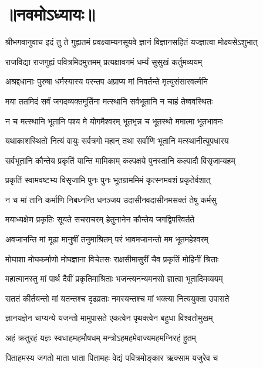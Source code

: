 \section{॥नवमोऽध्यायः॥}
{श्रीभगवानुवाच}
\twolineshloka
{इदं तु ते गुह्यतमं प्रवक्ष्याम्यनसूयवे}
{ज्ञानं विज्ञानसहितं यज्ज्ञात्वा मोक्ष्यसेऽशुभात्}%

\twolineshloka
{राजविद्या राजगुह्यं पवित्रमिदमुत्तमम्}
{प्रत्यक्षावगमं धर्म्यं सुसुखं कर्तुमव्ययम्}%

\twolineshloka
{अश्रद्दधानाः पुरुषा धर्मस्यास्य परन्तप}
{अप्राप्य मां निवर्तन्ते मृत्युसंसारवर्त्मनि}%

\twolineshloka
{मया ततमिदं सर्वं जगदव्यक्तमूर्तिना}
{मत्स्थानि सर्वभूतानि न चाहं तेष्ववस्थितः}%

\twolineshloka
{न च मत्स्थानि भूतानि पश्य मे योगमैश्वरम्}
{भूतभृन्न च भूतस्थो ममात्मा भूतभावनः}%

\twolineshloka
{यथाकाशस्थितो नित्यं वायुः सर्वत्रगो महान्}
{तथा सर्वाणि भूतानि मत्स्थानीत्युपधारय}%

\twolineshloka
{सर्वभूतानि कौन्तेय प्रकृतिं यान्ति मामिकाम्}
{कल्पक्षये पुनस्तानि कल्पादौ विसृजाम्यहम्}%

\twolineshloka
{प्रकृतिं स्वामवष्टभ्य विसृजामि पुनः पुनः}
{भूतग्राममिमं कृत्स्नमवशं प्रकृतेर्वशात्}%

\twolineshloka
{न च मां तानि कर्माणि निबध्नन्ति धनञ्जय}
{उदासीनवदासीनमसक्तं तेषु कर्मसु}%

\twolineshloka
{मयाध्यक्षेण प्रकृतिः सूयते सचराचरम्}
{हेतुनानेन कौन्तेय जगद्विपरिवर्तते}%

\twolineshloka
{अवजानन्ति मां मूढा मानुषीं तनुमाश्रितम्}
{परं भावमजानन्तो मम भूतमहेश्वरम्}%

\twolineshloka
{मोघाशा मोघकर्माणो मोघज्ञाना विचेतसः}
{राक्षसीमासुरीं चैव प्रकृतिं मोहिनीं श्रिताः}%

\twolineshloka
{महात्मानस्तु मां पार्थ दैवीं प्रकृतिमाश्रिताः}
{भजन्त्यनन्यमनसो ज्ञात्वा भूतादिमव्ययम्}%

\twolineshloka
{सततं कीर्तयन्तो मां यतन्तश्च दृढव्रताः}
{नमस्यन्तश्च मां भक्त्या नित्ययुक्ता उपासते}%

\twolineshloka
{ज्ञानयज्ञेन चाप्यन्ये यजन्तो मामुपासते}
{एकत्वेन पृथक्त्वेन बहुधा विश्वतोमुखम्}%

\twolineshloka
{अहं क्रतुरहं यज्ञः स्वधाहमहमौषधम्}
{मन्त्रोऽहमहमेवाज्यमहमग्निरहं हुतम्}%

\twolineshloka
{पिताहमस्य जगतो माता धाता पितामहः}
{वेद्यं पवित्रमोङ्कार ऋक्साम यजुरेव च}%

